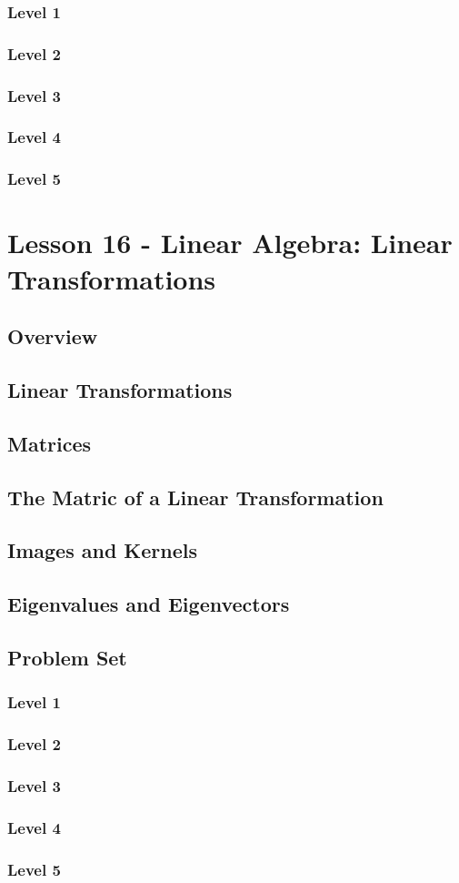\documentclass{article}
\begin{document}
\subsubsection{Level 1}
\subsubsection{Level 2}
\subsubsection{Level 3}
\subsubsection{Level 4}
\subsubsection{Level 5}
\pagebreak

\section{Lesson 16 - Linear Algebra: Linear Transformations}
\subsection{Overview}
\subsection{Linear Transformations}
\subsection{Matrices}
\subsection{The Matric of a Linear Transformation}
\subsection{Images and Kernels}
\subsection{Eigenvalues and Eigenvectors}
\subsection{Problem Set}
\subsubsection{Level 1}
\subsubsection{Level 2}
\subsubsection{Level 3}
\subsubsection{Level 4}
\subsubsection{Level 5}
\pagebreak
\end{document}

